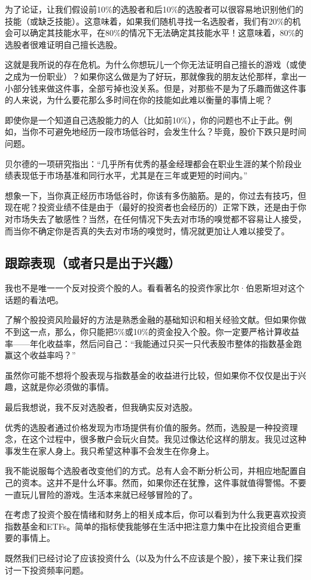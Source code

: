 为了论证，让我们假设前10\%的选股者和后10\%的选股者可以很容易地识别他们的技能（或缺乏技能）。这意味着，如果我们随机寻找一名选股者，我们有20\%的机会可以确定其技能水平，在80\%的情况下无法确定其技能水平！这意味着，80\%的选股者很难证明自己擅长选股。

这就是我所说的存在危机。为什么你想玩儿一个你无法证明自己擅长的游戏（或使之成为一份职业）？如果你这么做是为了好玩，那就像我的朋友达伦那样，拿出一小部分钱来做这件事，全部亏掉也没关系。但是，对那些不是为了乐趣而做这件事的人来说，为什么要花那么多时间在你的技能如此难以衡量的事情上呢？

即使你是一个知道自己选股能力的人（比如前10\%），你的问题也不止于此。例如，当你不可避免地经历一段市场低谷时，会发生什么？毕竟，股价下跌只是时间问题。

贝尔德的一项研究指出：“几乎所有优秀的基金经理都会在职业生涯的某个阶段业绩表现低于市场基准和同行水平，尤其是在三年或更短的时间内。”

想象一下，当你真正经历市场低谷时，你该有多伤脑筋。是的，你过去有技巧，但现在呢？投资业绩不佳是由于（最好的投资者也会经历的）正常下跌，还是由于你对市场失去了敏感性？当然，在任何情况下失去对市场的嗅觉都不容易让人接受，而当你不确定你是否真的失去对市场的嗅觉时，情况就更加让人难以接受了。

\subsection{跟踪表现（或者只是出于兴趣）}
我也不是唯一一个反对投资个股的人。看看著名的投资作家比尔·伯恩斯坦对这个话题的看法吧。

了解个股投资风险最好的方法是熟悉金融的基础知识和相关经验文献。但如果你做不到这一点，那么，你只能把5\%或10\%的资金投入个股。你一定要严格计算收益率——年化收益率，然后问自己：“我能通过只买一只代表股市整体的指数基金跑赢这个收益率吗？”

虽然你可能不想将个股表现与指数基金的收益进行比较，但如果你不仅仅是出于兴趣，这就是你必须做的事情。

最后我想说，我不反对选股者，但我确实反对选股。

优秀的选股者通过价格发现为市场提供有价值的服务。然而，选股是一种投资理念，在这个过程中，很多散户会玩火自焚。我见过像达伦这样的朋友。我见过这种事发生在家人身上。我只希望这种事不会发生在你身上。

我不能说服每个选股者改变他们的方式。总有人会不断分析公司，并相应地配置自己的资本。这并不是什么坏事。然而，如果你还在犹豫，这件事就值得警惕。不要一直玩儿冒险的游戏。生活本来就已经够冒险的了。

在考虑了投资个股在情绪和财务上的相关成本后，你可以看到为什么我更喜欢投资指数基金和ETFs。简单的指标使我能够在生活中把注意力集中在比投资组合更重要的事情上。

既然我们已经讨论了应该投资什么（以及为什么不应该是个股），接下来让我们探讨一下投资频率问题。

